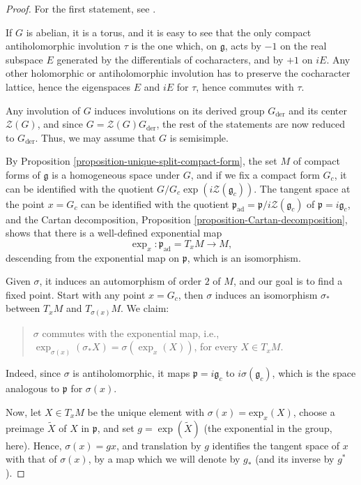 \begin{proof}

For the first statement, see \cite[Lemma 3.1]{Adams-Taibi}.

If $G$ is abelian, it is a torus, and it is easy to see that the only compact antiholomorphic involution $\tau$ is the one which, on $\mathfrak g$, acts by $-1$ on the real subspace $E$ generated by the differentials of cocharacters, and by $+1$ on $iE$. Any other holomorphic or antiholomorphic involution has to preserve the cocharacter lattice, hence the eigenspaces $E$ and $iE$ for $\tau$, hence commutes with $\tau$. 

Any involution of $G$ induces involutions on its derived group $G_{\text{der}}$ and its center $\mathcal Z(G)$, and since $G = \mathcal Z(G) G_{\text{der}}$, the rest of the statements are now reduced to $G_{\text{der}}$. Thus, we may assume that $G$ is semisimple.

By Proposition \ref{proposition-unique-split-compact-form}, the set $M$ of compact forms of $\mathfrak g$ is a homogeneous space under $G$, and if we fix a compact form $G_c$, it can be identified with the quotient $G/G_c \exp(i \mathcal Z(\mathfrak g_c))$. The tangent space at the point $x=G_c$ can be identified with the quotient $\mathfrak p_{\text{ad}} = \mathfrak p/i \mathcal Z(\mathfrak g_c)$ of $\mathfrak p = i \mathfrak g_c$, and the Cartan decomposition, Proposition \ref{proposition-Cartan-decomposition}, shows that there is a well-defined exponential map 
$$\exp_x: \mathfrak p_{\text{ad}}  = T_x M \to M,$$
descending from the exponential map on $\mathfrak p$, which is an isomorphism. 

Given $\sigma$, it induces an automorphism of order $2$ of $M$, and our goal is to find a fixed point. Start with any point $x = G_c$, then $\sigma$ induces an isomorphism $\sigma_*$ between $T_x M$ and $T_{\sigma(x)} M$. We claim:

\begin{quote}
 $\sigma$ commutes with the exponential map, i.e., $\exp_{\sigma(x)} (\sigma_* X) = \sigma(\exp_x(X))$, for every $X \in T_x M$. 
\end{quote}

Indeed, since $\sigma$ is antiholomorphic, it maps $\mathfrak p = i \mathfrak g_c$ to $i\sigma(\mathfrak g_c)$, which is the space analogous to $\mathfrak p$ for $\sigma(x)$.

Now, let $X\in T_x M$ be the unique element with $\sigma(x) = \text{exp}_x(X)$, choose a preimage $\tilde X$ of $X$ in $\mathfrak p$, and set $g = \exp(\tilde X)$ (the exponential in the group, here). Hence, $\sigma(x) = g x$, and translation by $g$ identifies the tangent space of $x$ with that of $\sigma(x)$, by a map which we will denote by $g_*$ (and its inverse by $g^*$). 


\end{proof}
